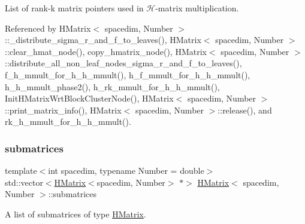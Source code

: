 List of rank-\/k matrix pointers used in $\mathcal{H}$-\/matrix multiplication. 

Referenced by H\+Matrix$<$ spacedim, Number $>$\+::\+\_\+distribute\+\_\+sigma\+\_\+r\+\_\+and\+\_\+f\+\_\+to\+\_\+leaves(), H\+Matrix$<$ spacedim, Number $>$\+::clear\+\_\+hmat\+\_\+node(), copy\+\_\+hmatrix\+\_\+node(), H\+Matrix$<$ spacedim, Number $>$\+::distribute\+\_\+all\+\_\+non\+\_\+leaf\+\_\+nodes\+\_\+sigma\+\_\+r\+\_\+and\+\_\+f\+\_\+to\+\_\+leaves(), f\+\_\+h\+\_\+mmult\+\_\+for\+\_\+h\+\_\+h\+\_\+mmult(), h\+\_\+f\+\_\+mmult\+\_\+for\+\_\+h\+\_\+h\+\_\+mmult(), h\+\_\+h\+\_\+mmult\+\_\+phase2(), h\+\_\+rk\+\_\+mmult\+\_\+for\+\_\+h\+\_\+h\+\_\+mmult(), Init\+H\+Matrix\+Wrt\+Block\+Cluster\+Node(), H\+Matrix$<$ spacedim, Number $>$\+::print\+\_\+matrix\+\_\+info(), H\+Matrix$<$ spacedim, Number $>$\+::release(), and rk\+\_\+h\+\_\+mmult\+\_\+for\+\_\+h\+\_\+h\+\_\+mmult().

\mbox{\label{classHMatrix_a4bd1b9a32f2c7693e603a7c6ea916e4f}} 
\subsubsection{\texorpdfstring{submatrices}{submatrices}}
{\footnotesize\ttfamily template$<$int spacedim, typename Number = double$>$ \\
std\+::vector$<$\hyperlink{classHMatrix}{H\+Matrix}$<$spacedim, Number$>$ $\ast$$>$ \hyperlink{classHMatrix}{H\+Matrix}$<$ spacedim, Number $>$\+::submatrices\hspace{0.3cm}{\ttfamily [private]}}

A list of submatrices of type \hyperlink{classHMatrix}{H\+Matrix}. 

